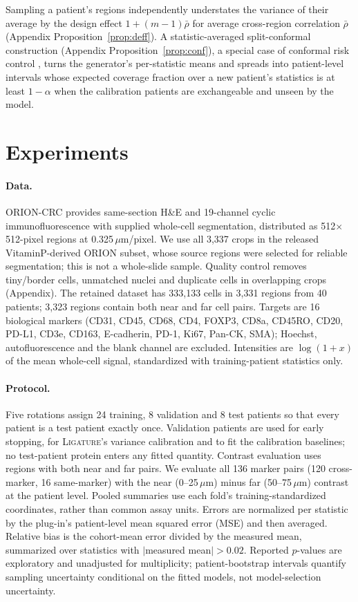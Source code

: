 \documentclass[10pt,letterpaper]{article}
\theoremstyle{definition}
\theoremstyle{remark}
\newcommand{\method}{\textnormal{\textsc{Ligature}}}
\begin{document}
Sampling a patient's regions independently understates the variance of their average by the design effect $1+(m-1)\bar\rho$ for average cross-region correlation $\bar\rho$ (Appendix Proposition~\ref{prop:deff}).
A statistic-averaged split-conformal construction (Appendix Proposition~\ref{prop:conf}), a special case of conformal risk control \citep{crc2024}, turns the generator's per-statistic means and spreads into patient-level intervals whose expected coverage fraction over a new patient's statistics is at least $1-\alpha$ when the calibration patients are exchangeable and unseen by the model.

\section{Experiments}
\label{sec:experiments}

\paragraph{Data.} ORION-CRC \citep{orion2023} provides same-section H\&E and 19-channel cyclic immunofluorescence with supplied whole-cell segmentation, distributed as 512$\times$512-pixel regions at 0.325\,$\mu$m/pixel. We use all 3,337 crops in the released VitaminP-derived ORION subset, whose source regions were selected for reliable segmentation; this is not a whole-slide sample. Quality control removes tiny/border cells, unmatched nuclei and duplicate cells in overlapping crops (Appendix). The retained dataset has 333,133 cells in 3,331 regions from 40 patients; 3,323 regions contain both near and far cell pairs. Targets are 16 biological markers (CD31, CD45, CD68, CD4, FOXP3, CD8a, CD45RO, CD20, PD-L1, CD3e, CD163, E-cadherin, PD-1, Ki67, Pan-CK, SMA); Hoechst, autofluorescence and the blank channel are excluded. Intensities are $\log(1+x)$ of the mean whole-cell signal, standardized with training-patient statistics only.

\paragraph{Protocol.} Five rotations assign 24 training, 8 validation and 8 test patients so that every patient is a test patient exactly once. Validation patients are used for early stopping, for \method{}'s variance calibration and to fit the calibration baselines; no test-patient protein enters any fitted quantity. Contrast evaluation uses regions with both near and far pairs. We evaluate all 136 marker pairs (120 cross-marker, 16 same-marker) with the near (0--25\,$\mu$m) minus far (50--75\,$\mu$m) contrast at the patient level. Pooled summaries use each fold's training-standardized coordinates, rather than common assay units. Errors are normalized per statistic by the plug-in's patient-level mean squared error (MSE) and then averaged. Relative bias is the cohort-mean error divided by the measured mean, summarized over statistics with $|$measured mean$|>0.02$. Reported $p$-values are exploratory and unadjusted for multiplicity; patient-bootstrap intervals quantify sampling uncertainty conditional on the fitted models, not model-selection uncertainty.
\end{document}
